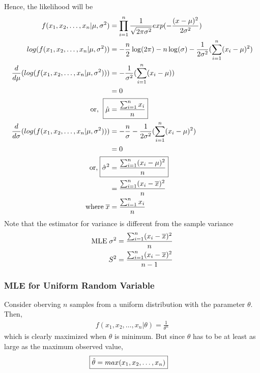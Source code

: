 \documentclass[../probability-notes.tex]{subfiles}
\begin{document}
    Hence, the likelihood will be
    \begin{align*}
        f(x_{1}, x_{2}, \ldots, x_{n}|\mu, \sigma^{2}) &= \prod_{i=1}^{n} \frac{1}{\sqrt{2 \pi \sigma^{2}}} exp(-\frac{(x-\mu)^{2}}{2\sigma^{2}})\\
        log(f(x_{1}, x_{2}, \ldots, x_{n}|\mu, \sigma^{2})) &= -\frac{n}{2}\log(2\pi) - n\log(\sigma) - \frac{1}{2\sigma^{2}}(\sum_{i=1}^{n} (x_{i} - \mu)^{2})\\
        \frac{d}{d\mu}(log(f(x_{1}, x_{2}, \ldots, x_{n}|\mu, \sigma^{2}))) &= -\frac{1}{\sigma^{2}}(\sum_{i=1}^{n} (x_{i} - \mu))\\
        &= 0\\
        \text{or, \;} \Aboxed{\hat{\mu} &= \frac{\sum_{i=1}^{n} x_{i}}{n}}\\
        \frac{d}{d\sigma}(log(f(x_{1}, x_{2}, \ldots, x_{n}|\mu, \sigma^{2}))) &= - \frac{n}{\sigma} - \frac{1}{2\sigma^{2}}(\sum_{i=1}^{n} (x_{i} - \mu)^{2})\\
        &= 0\\
        \text{or,\;} \Aboxed{\hat{\sigma}^{2} &= \frac{\sum_{i=1}^{n}(x_{i} - \mu)^2}{n}}\\
        &= \frac{\sum_{i=1}^{n}(x_{i} - \overline{x})^2}{n}\\
        \text{where\;} \overline{x} &= \frac{\sum_{i=1}^{n} x_{i}}{n}
    \end{align*}
    Note that the estimator for variance is different from the sample variance
    \begin{align*}
        \text{MLE\;} \sigma^{2} &= \frac{\sum_{i=1}^{n}(x_{i} - \overline{x})^2}{n}\\
        S^{2} &= \frac{\sum_{i=1}^{n}(x_{i} - \overline{x})^2}{n - 1}
    \end{align*}


    \subsubsection{MLE for Uniform Random Variable}
    Consider oberving $n$ samples from a uniform distribution with the parameter $\theta$. Then,
    \begin{align*}
        f(x_{1}, x_{2}, \ldots, x_{n}|\theta) = \frac{1}{\theta^{n}}
    \end{align*}
    which is clearly maximized when $\theta$ is minimum. But since $\theta$ has to be at least as large as the maximum observed value,
    \begin{align*}
        \Aboxed{\hat{\theta} = max(x_{1}, x_{2}, \ldots, x_{n})}
    \end{align*}
\end{document}

